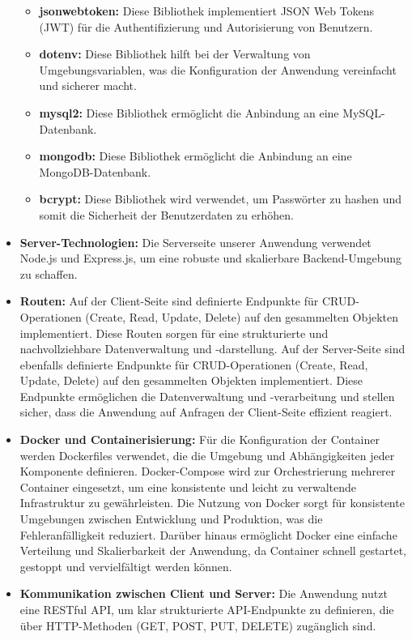 \begin{itemize}[itemsep=1em, leftmargin=*]
\begin{itemize}[itemsep=1em, leftmargin=*]
        \item \textbf{jsonwebtoken:} Diese Bibliothek implementiert JSON Web Tokens (JWT) für die Authentifizierung und Autorisierung von Benutzern.
        \item \textbf{dotenv:} Diese Bibliothek hilft bei der Verwaltung von Umgebungsvariablen, was die Konfiguration der Anwendung vereinfacht und sicherer macht.
        \item \textbf{mysql2:} Diese Bibliothek ermöglicht die Anbindung an eine MySQL-Datenbank.
        \item \textbf{mongodb:} Diese Bibliothek ermöglicht die Anbindung an eine MongoDB-Datenbank.
        \item \textbf{bcrypt:} Diese Bibliothek wird verwendet, um Passwörter zu hashen und somit die Sicherheit der Benutzerdaten zu erhöhen.
    \end{itemize}
    \item \textbf{Server-Technologien:} Die Serverseite unserer Anwendung verwendet Node.js und Express.js, um eine robuste und skalierbare Backend-Umgebung zu schaffen.
    \item \textbf{Routen:} Auf der Client-Seite sind definierte Endpunkte für CRUD-Operationen (Create, Read, Update, Delete) auf den gesammelten Objekten implementiert.
    Diese Routen sorgen für eine strukturierte und nachvollziehbare Datenverwaltung und -darstellung.
    Auf der Server-Seite sind ebenfalls definierte Endpunkte für CRUD-Operationen (Create, Read, Update, Delete) auf den gesammelten Objekten implementiert.
    Diese Endpunkte ermöglichen die Datenverwaltung und -verarbeitung und stellen sicher, dass die Anwendung auf Anfragen der Client-Seite effizient reagiert.
    \item \textbf{Docker und Containerisierung:} Für die Konfiguration der Container werden Dockerfiles verwendet, die die Umgebung und Abhängigkeiten jeder Komponente definieren.
    Docker-Compose wird zur Orchestrierung mehrerer Container eingesetzt, um eine konsistente und leicht zu verwaltende Infrastruktur zu gewährleisten.
    Die Nutzung von Docker sorgt für konsistente Umgebungen zwischen Entwicklung und Produktion, was die Fehleranfälligkeit reduziert.
    Darüber hinaus ermöglicht Docker eine einfache Verteilung und Skalierbarkeit der Anwendung, da Container schnell gestartet, gestoppt und vervielfältigt werden können.
    \item \textbf{Kommunikation zwischen Client und Server:} Die Anwendung nutzt eine RESTful API, um klar strukturierte API-Endpunkte zu definieren, die über HTTP-Methoden (GET, POST, PUT, DELETE) zugänglich sind.

\end{itemize}
